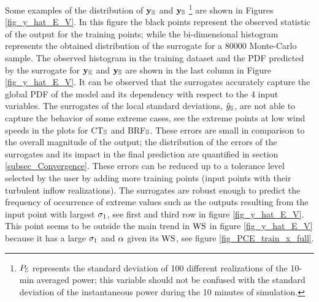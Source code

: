 \documentclass[preprint,12pt]{elsarticle}
\begin{document}
Some examples of the distribution of  $\mathbf{y}_{\mathbb{E}}$ and $\mathbf{y}_{\mathbb{S}}$ \footnote{$P_{\mathbb{S}}$ represents the standard deviation of 100 different realizations of the 10-min averaged power; this variable should not be confused with the standard deviation of the instantaneous power during the 10 minutes of simulation.} are shown in Figures \ref{fig_y_hat_E_V}. In this figure the black points represent the observed statistic of the output for the training points; while the bi-dimensional histogram represents the obtained distribution of the surrogate for a 80000 Monte-Carlo sample. The observed histogram in the training dataset and the PDF predicted by the surrogate for $\mathbf{y}_{\mathbb{E}}$ and $\mathbf{y}_{\mathbb{S}}$ are shown in the last column in Figure \ref{fig_y_hat_E_V}. It can be observed that the surrogates accurately capture the global PDF of the model and its dependency with respect to the 4 input variables. The surrogates of the local standard deviations, $\hat{y}_{\mathbb{S}}$, are not able to capture the behavior of some extreme cases, see the extreme points at low wind speeds in the plots for CT$_{\mathbb{S}}$ and BRF$_{\mathbb{S}}$. These errors are small in comparison to the overall magnitude of the output; the distribution of the errors of the surrogates and its impact in the final prediction are quantified in section \ref{subsec_Convergence}. These errors can be reduced up to a tolerance level selected by the user by adding more training points (input points with their turbulent inflow realizations). The surrogates are robust enough to predict the frequency of occurrence of extreme values such as the outputs resulting from the input point with largest $\sigma_{1}$, see first and third row in figure \ref{fig_y_hat_E_V}. This point seems to be outside the main trend in $\text{WS}$ in figure \ref{fig_y_hat_E_V} because it has a large $\sigma_{1}$ and $\alpha$ given its $\text{WS}$, see figure \ref{fig_PCE_train_x_full}.
\end{document}
